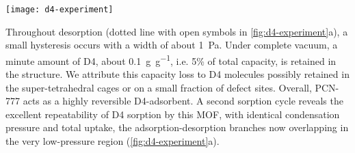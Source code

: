 \begin{widefigure}[htb]
    \centering
    \texttt{[image: d4-experiment]}
    \caption{%
        (a) Single component adsorption/desorption isotherms for D4 (blue) and
         (red) collected at \SI{303}{\kelvin} for PCN-777 in the
        pressure range of 0-\SI{10}{\pascal} (corresponding to 0--0.05
        p/p\textsuperscript{0} for D4). Solid and open symbols represent
        adsorption and desorption branches, respectively. (b) Comparison of the
        D4 capacity of MOFs with other classes of porous materials as detailed
        in Ref \citep{wangRecentAdvancesTechnologies2019}, (c) 5 D4
        sorption-desorption cycles recorded after the first two isotherms on
        PCN-777, in the same pressure range. (d) PXRD of pristine PCN-777
        (black) and samples recovered after D4 cycling (blue) and water
        adsorption (red)
    }\label{fig:d4-experiment}
\end{widefigure}

Throughout desorption (dotted line with open symbols in
\cref{fig:d4-experiment}a), a small hysteresis occurs with a width of about
\SI{1}{\pascal}. Under complete vacuum, a minute amount of D4, about
\SI{0.1}{\gram\per\gram}, i.e. 5\% of total capacity, is retained in the
structure. We attribute this capacity loss to D4 molecules possibly retained in
the super-tetrahedral cages or on a small fraction of defect sites. Overall,
PCN-777 acts as a highly reversible D4-adsorbent. A second sorption cycle
reveals the excellent repeatability of D4 sorption by this MOF, with identical
condensation pressure and total uptake, the adsorption-desorption branches now
overlapping in the very low-pressure region (\cref{fig:d4-experiment}a).


